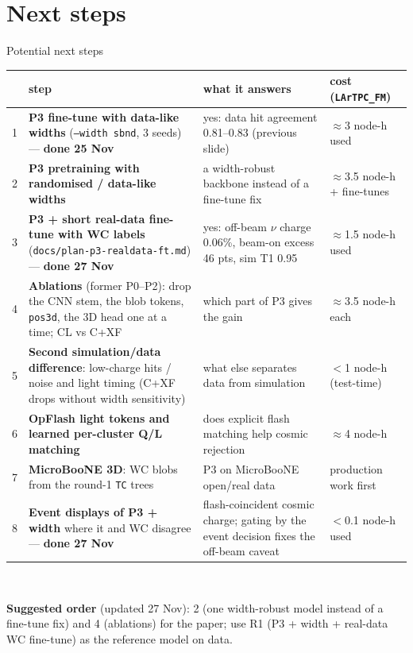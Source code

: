 \documentclass[aspectratio=169,10pt]{beamer}
\newcommand{\code}[1]{\texttt{#1}}
\newcommand{\good}[1]{{\color{green!45!black}\textbf{#1}}}
\begin{document}
\section{Next steps}
\begin{frame}{Potential next steps}
  \tiny
  \centering
  \renewcommand{\arraystretch}{1.15}
  \begin{tabular}{c>{\raggedright\arraybackslash}p{5.9cm}>{\raggedright\arraybackslash}p{4.5cm}>{\raggedright\arraybackslash}p{2.3cm}}
    \toprule
    & step & what it answers & cost (\code{LArTPC\_FM}) \\
    \midrule
    1 & \textbf{P3 fine-tune with data-like widths} (\code{--width sbnd}, 3 seeds) --- \good{done 25 Nov} & yes: data hit agreement 0.81--0.83 (previous slide) & $\approx$3 node-h used \\
    2 & \textbf{P3 pretraining with randomised / data-like widths} & a width-robust backbone instead of a fine-tune fix & $\approx$3.5 node-h + fine-tunes \\
    3 & \textbf{P3 + short real-data fine-tune with WC labels} (\code{docs/plan-p3-realdata-ft.md}) --- \good{done 27 Nov} & yes: off-beam $\nu$ charge 0.06\%, beam-on excess 46 pts, sim T1 0.95 & $\approx$1.5 node-h used \\
    4 & \textbf{Ablations} (former P0--P2): drop the CNN stem, the blob tokens, \code{pos3d}, the 3D head one at a time; CL vs C+XF & which part of P3 gives the gain & $\approx$3.5 node-h each \\
    5 & \textbf{Second simulation/data difference}: low-charge hits / noise and light timing (C+XF drops without width sensitivity) & what else separates data from simulation & $<$1 node-h (test-time) \\
    6 & \textbf{OpFlash light tokens and learned per-cluster Q/L matching} & does explicit flash matching help cosmic rejection & $\approx$4 node-h \\
    7 & \textbf{MicroBooNE 3D}: WC blobs from the round-1 \code{TC} trees & P3 on MicroBooNE open/real data & production work first \\
    8 & \textbf{Event displays of P3 + width} where it and WC disagree --- \good{done 27 Nov} & flash-coincident cosmic charge; gating by the event decision fixes the off-beam caveat & $<$0.1 node-h used \\
    \bottomrule
  \end{tabular}\\[6pt]
  \raggedright\footnotesize
  \textbf{Suggested order} (updated 27 Nov): 2 (one width-robust model instead of a fine-tune fix) and 4 (ablations) for the paper; use R1 (P3 + width + real-data WC fine-tune) as the reference model on data.
\end{frame}
\end{document}
